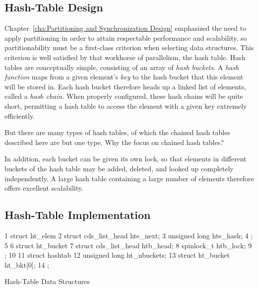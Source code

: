 \subsection{Hash-Table Design}
\label{sec:datastruct:Hash-Table Design}

Chapter~\ref{cha:Partitioning and Synchronization Design}
emphasized the need to apply partitioning in order to attain
respectable performance and scalability, so partitionability
must be a first-class criterion when selecting data structures.
This criterion is well satisfied by that workhorse of parallelism,
the hash table.
Hash tables are conceptually simple, consisting of an array of
\emph{hash buckets}.
A \emph{hash function} maps from a given element's \emph{key}
to the hash bucket that this element will be stored in.
Each hash bucket therefore heads up a linked list of elements,
called a \emph{hash chain}.
When properly configured, these hash chains will be quite short,
permitting a hash table to access the element with a given key
extremely efficiently.

\QuickQuiz{}
	But there are many types of hash tables, of which the chained
	hash tables described here are but one type.
	Why the focus on chained hash tables?
 \QuickQuizEnd

In addition, each bucket can be given its own lock, so that
elements in different buckets of the hash table may be added,
deleted, and looked up completely independently.
A large hash table containing a large number of elements therefore
offers excellent scalability.

\subsection{Hash-Table Implementation}
\label{sec:datastruct:Hash-Table Implementation}

\begin{listing}[tb]
{ \scriptsize
\begin{verbbox}
 1 struct ht_elem {
 2   struct cds_list_head hte_next;
 3   unsigned long hte_hash;
 4 };
 5 
 6 struct ht_bucket {
 7   struct cds_list_head htb_head;
 8   spinlock_t htb_lock;
 9 };
10 
11 struct hashtab {
12   unsigned long ht_nbuckets;
13   struct ht_bucket ht_bkt[0];
14 };
\end{verbbox}
}
\centering
\theverbbox
\caption{Hash-Table Data Structures}
\label{lst:datastruct:Hash-Table Data Structures}
\end{listing}

